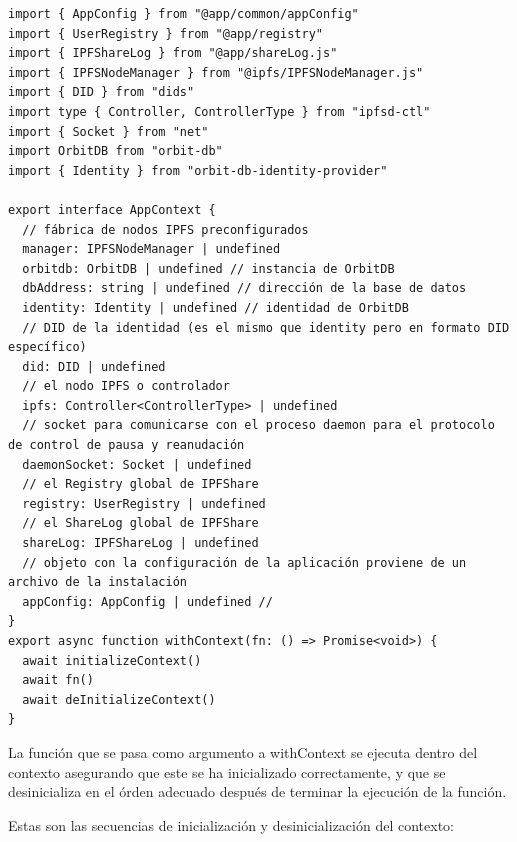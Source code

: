 \begin{verbatim}
import { AppConfig } from "@app/common/appConfig"
import { UserRegistry } from "@app/registry"
import { IPFShareLog } from "@app/shareLog.js"
import { IPFSNodeManager } from "@ipfs/IPFSNodeManager.js"
import { DID } from "dids"
import type { Controller, ControllerType } from "ipfsd-ctl"
import { Socket } from "net"
import OrbitDB from "orbit-db"
import { Identity } from "orbit-db-identity-provider"

export interface AppContext {
  // fábrica de nodos IPFS preconfigurados
  manager: IPFSNodeManager | undefined
  orbitdb: OrbitDB | undefined // instancia de OrbitDB
  dbAddress: string | undefined // dirección de la base de datos
  identity: Identity | undefined // identidad de OrbitDB
  // DID de la identidad (es el mismo que identity pero en formato DID específico)
  did: DID | undefined 
  // el nodo IPFS o controlador
  ipfs: Controller<ControllerType> | undefined 
  // socket para comunicarse con el proceso daemon para el protocolo de control de pausa y reanudación
  daemonSocket: Socket | undefined 
  // el Registry global de IPFShare
  registry: UserRegistry | undefined
  // el ShareLog global de IPFShare
  shareLog: IPFShareLog | undefined
  // objeto con la configuración de la aplicación proviene de un archivo de la instalación
  appConfig: AppConfig | undefined // 
}
export async function withContext(fn: () => Promise<void>) {
  await initializeContext()
  await fn()
  await deInitializeContext()
}
\end{verbatim}
La función que se pasa como argumento a withContext se ejecuta dentro del contexto asegurando que este se ha inicializado correctamente, y que se desinicializa en el órden adecuado después de terminar la ejecución de la función.

Estas son las secuencias de inicialización y desinicialización del contexto:

